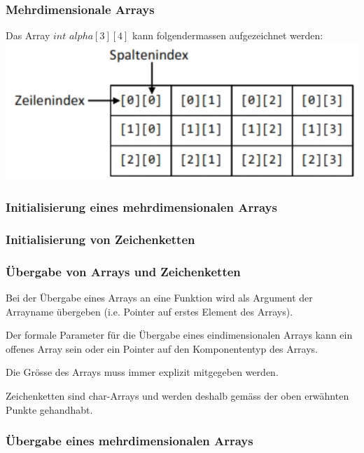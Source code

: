 		\begin{minipage}[t]{9 cm}	
			\subsubsection{Mehrdimensionale Arrays }
				Das Array $int$ $alpha[3][4]$ kann folgendermassen aufgezeichnet werden: \\
				\includegraphics[width=1\textwidth]{pics/array_mehrdimensional.jpg}
			
			\subsubsection{Initialisierung eines mehrdimensionalen Arrays }
				
		\end{minipage}

		\subsubsection{Initialisierung von Zeichenketten }
			
			
		\subsubsection{Übergabe von Arrays und Zeichenketten }
			\begin{compactitem}
				\item Bei der Übergabe eines Arrays an eine Funktion wird als Argument der Arrayname übergeben (i.e. Pointer auf erstes Element des Arrays).
				\item Der formale Parameter für die Übergabe eines eindimensionalen Arrays kann ein offenes Array sein oder ein Pointer auf den Komponententyp des Arrays.
				\item Die Grösse des Arrays muss immer explizit mitgegeben werden.
				\item Zeichenketten sind char-Arrays und werden deshalb gemäss der oben erwähnten Punkte gehandhabt.
			\end{compactitem}
			
			
		\subsubsection{Übergabe eines mehrdimensionalen Arrays}
			